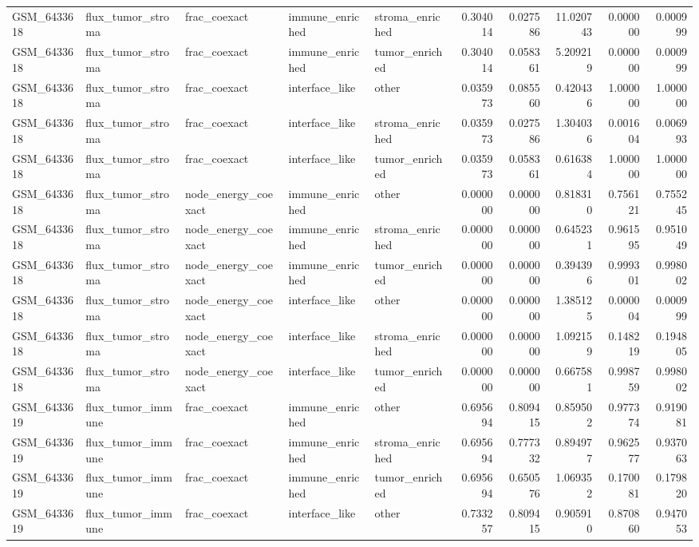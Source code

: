 \begin{table}
\begin{tabular}{lllllrrrrr}
GSM_6433618 & flux_tumor_stroma & frac_coexact & immune_enriched & stroma_enriched & 0.304014 & 0.027586 & 11.020743 & 0.000000 & 0.000999 \\
GSM_6433618 & flux_tumor_stroma & frac_coexact & immune_enriched & tumor_enriched & 0.304014 & 0.058361 & 5.209219 & 0.000000 & 0.000999 \\
GSM_6433618 & flux_tumor_stroma & frac_coexact & interface_like & other & 0.035973 & 0.085560 & 0.420436 & 1.000000 & 1.000000 \\
GSM_6433618 & flux_tumor_stroma & frac_coexact & interface_like & stroma_enriched & 0.035973 & 0.027586 & 1.304036 & 0.001604 & 0.006993 \\
GSM_6433618 & flux_tumor_stroma & frac_coexact & interface_like & tumor_enriched & 0.035973 & 0.058361 & 0.616384 & 1.000000 & 1.000000 \\
GSM_6433618 & flux_tumor_stroma & node_energy_coexact & immune_enriched & other & 0.000000 & 0.000000 & 0.818310 & 0.756121 & 0.755245 \\
GSM_6433618 & flux_tumor_stroma & node_energy_coexact & immune_enriched & stroma_enriched & 0.000000 & 0.000000 & 0.645231 & 0.961595 & 0.951049 \\
GSM_6433618 & flux_tumor_stroma & node_energy_coexact & immune_enriched & tumor_enriched & 0.000000 & 0.000000 & 0.394396 & 0.999301 & 0.998002 \\
GSM_6433618 & flux_tumor_stroma & node_energy_coexact & interface_like & other & 0.000000 & 0.000000 & 1.385125 & 0.000004 & 0.000999 \\
GSM_6433618 & flux_tumor_stroma & node_energy_coexact & interface_like & stroma_enriched & 0.000000 & 0.000000 & 1.092159 & 0.148219 & 0.194805 \\
GSM_6433618 & flux_tumor_stroma & node_energy_coexact & interface_like & tumor_enriched & 0.000000 & 0.000000 & 0.667581 & 0.998759 & 0.998002 \\
GSM_6433619 & flux_tumor_immune & frac_coexact & immune_enriched & other & 0.695694 & 0.809415 & 0.859502 & 0.977374 & 0.919081 \\
GSM_6433619 & flux_tumor_immune & frac_coexact & immune_enriched & stroma_enriched & 0.695694 & 0.777332 & 0.894977 & 0.962577 & 0.937063 \\
GSM_6433619 & flux_tumor_immune & frac_coexact & immune_enriched & tumor_enriched & 0.695694 & 0.650576 & 1.069352 & 0.170081 & 0.179820 \\
GSM_6433619 & flux_tumor_immune & frac_coexact & interface_like & other & 0.733257 & 0.809415 & 0.905910 & 0.870860 & 0.947053 \\

\end{tabular}
\end{table}
